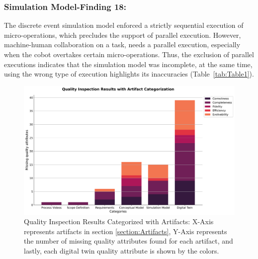 \documentclass{llncs}
\begin{document}
    \subsubsection{Simulation Model-Finding 18:}
        The discrete event simulation model enforced a strictly sequential execution of micro-operations,
        which precludes the support of parallel execution. 
        However, machine-human collaboration on a task, needs a parallel execution, especially when the cobot overtakes certain micro-operations. 
        Thus, the exclusion of parallel executions indicates that the simulation model was incomplete,
        at the same time, using the wrong type of execution highlights its inaccuracies (Table~\ref{tab:Table1}).
    \begin{figure}[htbp]
            \centering
            \includegraphics[scale = 0.35]{quality_inspection_results_with_artifacts.png}
            \caption{Quality Inspection Results Categorized with Artifacts: X-Axis represents artifacts in section \ref{section:Artifacts}, 
            Y-Axis represents the number of missing quality attributes found for each artifact, 
            and lastly, each digital twin quality attribute is shown by the colors.}\label{fig:QualityInspectonResultsWithArtifacts}
    \end{figure}
\end{document}
